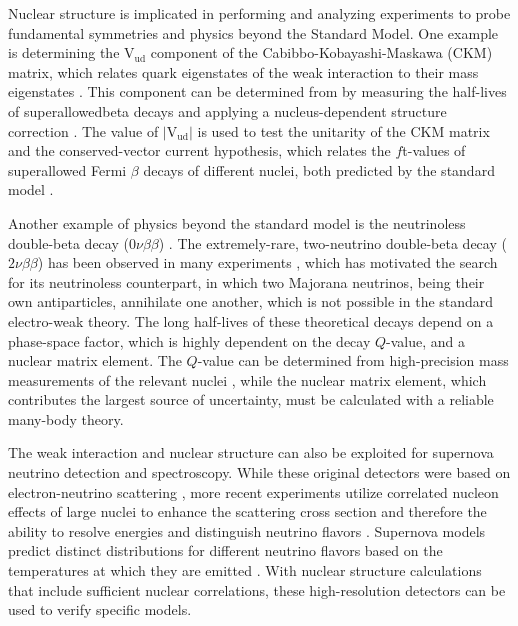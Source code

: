 \documentclass[../thesis.tex]{subfiles}
\begin{document}
Nuclear structure is implicated in performing and analyzing experiments to probe fundamental symmetries and physics beyond the Standard Model. One example is determining the $\mathrm{V_{ud}}$ component of the Cabibbo-Kobayashi-Maskawa (CKM) matrix, which relates quark eigenstates of the weak interaction to their mass eigenstates \cite{CABBIBO1963531,KOBAYASHI1973652}. This component can be determined from by measuring the half-lives of superallowedbeta decays \cite{TOWNER2003197} and applying a nucleus-dependent structure correction \cite{TOWNER2008025501,TOWNER199413,TOWNER1992478,BARKER1992501,JAUS1990166}. The value of $\left|\mathrm{V_{ud}}\right|$ is used to test the unitarity of the CKM matrix and the conserved-vector current hypothesis, which relates the $f$t-values of superallowed Fermi $\beta$ decays of different nuclei, both predicted by the standard model \cite{HARDY2005055501}.

Another example of physics beyond the standard model is the neutrinoless double-beta decay ($0\nu\beta\beta$) \cite{SUHONEN1998123,AVIGNONE2008481}. The extremely-rare, two-neutrino double-beta decay ($2\nu\beta\beta$) has been observed in many experiments \cite{ELLIOTT19872020,MILEY19903092}, which has motivated the search for its neutrinoless counterpart, in which two Majorana neutrinos, being their own antiparticles, annihilate one another, which is not possible in the standard electro-weak theory. The long half-lives of these theoretical decays depend on a phase-space factor, which is highly dependent on the decay $Q$-value, and a nuclear matrix element. The $Q$-value can be determined from high-precision mass measurements of the relevant nuclei \cite{LINCOLN2013012501,GULYUZ2015055501,REDSHAW2012041306,BUSTABAD2013022501}, while the nuclear matrix element, which contributes the largest source of uncertainty, must be calculated with a reliable many-body theory. 

The weak interaction and nuclear structure can also be exploited for supernova neutrino detection and spectroscopy. While these original detectors were based on electron-neutrino scattering \cite{HIRATA19871490,BIONTA19871494}, more recent experiments utilize correlated nucleon effects of large nuclei to enhance the scattering cross section and therefore the ability to resolve energies and distinguish neutrino flavors \cite{HARGROVE1996183,CLINE1994720,EWAN1992373,LANGANKE19962629}. Supernova models predict distinct distributions for different neutrino flavors based on the temperatures at which they are emitted \cite{KOLBE20032569,BENHAR2005053005}. With nuclear structure calculations that include sufficient nuclear correlations, these high-resolution detectors can be used to verify specific models.
\end{document}
